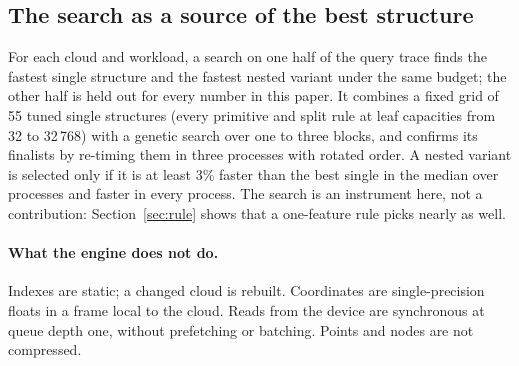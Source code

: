 \subsection{The search as a source of the best structure}\label{sec:search}

For each cloud and workload, a search on one half of the query trace finds the fastest single structure and the fastest nested variant under the same budget; the other half is held out for every number in this paper. It combines a fixed grid of 55 tuned single structures (every primitive and split rule at leaf capacities from 32 to 32\,768) with a genetic search over one to three blocks, and confirms its finalists by re-timing them in three processes with rotated order. A nested variant is selected only if it is at least 3\% faster than the best single in the median over processes and faster in every process. The search is an instrument here, not a contribution: Section~\ref{sec:rule} shows that a one-feature rule picks nearly as well.

\paragraph{What the engine does not do.} Indexes are static; a changed cloud is rebuilt. Coordinates are single-precision floats in a frame local to the cloud. Reads from the device are synchronous at queue depth one, without prefetching or batching. Points and nodes are not compressed.
